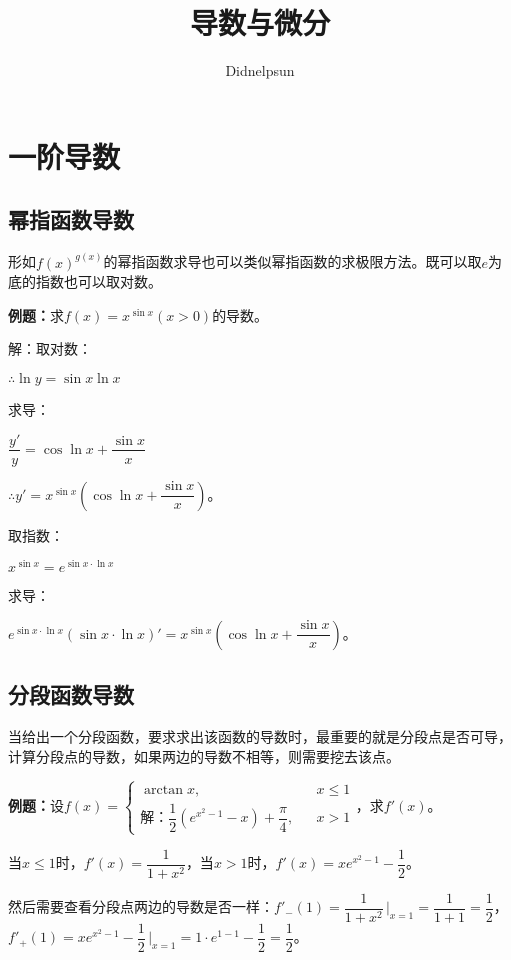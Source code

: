 \documentclass[UTF8, 12pt]{ctexart}
\author{Didnelpsun}
\title{导数与微分}
\date{}
\begin{document}
\maketitle
\pagestyle{empty}
\thispagestyle{empty}
\tableofcontents
\thispagestyle{empty}
\newpage
\pagestyle{plain}
\setcounter{page}{1}
\section{一阶导数}
\subsection{幂指函数导数}

形如$f(x)^{g(x)}$的幂指函数求导也可以类似幂指函数的求极限方法。既可以取$e$为底的指数也可以取对数。

\textbf{例题：}求$f(x)=x^{\sin x}(x>0)$的导数。

解：取对数：

$\therefore\ln y=\sin x\ln x$

求导：

$\dfrac{y'}{y}=\cos\ln x+\dfrac{\sin x}{x}$

$\therefore y'=x^{\sin x}\left(\cos\ln x+\dfrac{\sin x}{x}\right)$。

取指数：

$x^{\sin x}=e^{\sin x\cdot\ln x}$

求导：

$e^{\sin x\cdot\ln x}(\sin x\cdot\ln x)'=x^{\sin x}\left(\cos\ln x+\dfrac{\sin x}{x}\right)$。

\subsection{分段函数导数}

当给出一个分段函数，要求求出该函数的导数时，最重要的就是分段点是否可导，计算分段点的导数，如果两边的导数不相等，则需要挖去该点。\medskip

\textbf{例题：}设$f(x)=\left\{\begin{array}{lcl}
    \arctan x, & & x\leqslant 1 \\
解：    \dfrac{1}{2}(e^{x^2-1}-x)+\dfrac{\pi}{4}, & & x>1
\end{array}
\right.$，求$f'(x)$。

当$x\leqslant 1$时，$f'(x)=\dfrac{1}{1+x^2}$，当$x>1$时，$f'(x)=xe^{x^2-1}-\dfrac{1}{2}$。

然后需要查看分段点两边的导数是否一样：$f'_-(1)=\dfrac{1}{1+x^2}\,\bigg\vert_{x=1}=\dfrac{1}{1+1}=\dfrac{1}{2}$，$f'_+(1)=xe^{x^2-1}-\dfrac{1}{2}\,\bigg\vert_{x=1}=1\cdot e^{1-1}-\dfrac{1}{2}=\dfrac{1}{2}$。\medskip
\end{document}
